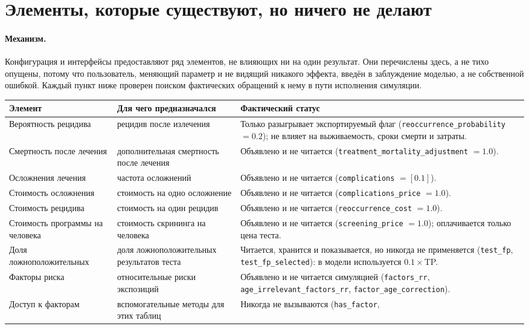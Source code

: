 \documentclass[12pt,a4paper]{article}
\newcommand{\id}[1]{\texttt{#1}}
\newcommand{\mech}[1]{\paragraph{Механизм.} #1}
\begin{document}
\section{Элементы, которые существуют, но ничего не делают}
\label{sec:inactive}

\mech{Конфигурация и интерфейсы предоставляют ряд элементов, не влияющих ни на один результат. Они
перечислены здесь, а не тихо опущены, потому что пользователь, меняющий параметр и не видящий никакого
эффекта, введён в заблуждение моделью, а не собственной ошибкой. Каждый пункт ниже проверен поиском
фактических обращений к нему в пути исполнения симуляции.

\begin{center}
\footnotesize\setlength{\tabcolsep}{3pt}
\begin{tabular}{@{}p{4.3cm}p{3.8cm}p{7.2cm}@{}}
\toprule
\textbf{Элемент} & \textbf{Для чего предназначался} & \textbf{Фактический статус} \\
\midrule
Вероятность рецидива & рецидив после излечения & Только разыгрывает экспортируемый флаг
(\id{reoccurrence\_probability} $=0.2$); не влияет на выживаемость, сроки смерти и затраты. \\
Смертность после лечения & дополнительная смертность после лечения & Объявлено и не читается
(\id{treatment\_mortality\_adjustment} $=1.0$). \\
Осложнения лечения & частота осложнений & Объявлено и не читается
(\id{complications} $=[0.1]$). \\
Стоимость осложнения & стоимость на одно осложнение & Объявлено и не читается
(\id{complications\_price} $=1.0$). \\
Стоимость рецидива & стоимость на один рецидив & Объявлено и не читается
(\id{reoccurrence\_cost} $=1.0$). \\
Стоимость программы на человека & стоимость скрининга на человека & Объявлено и не читается
(\id{screening\_price} $=1.0$); оплачивается только цена теста. \\
Доля ложноположительных & доля ложноположительных результатов теста & Читается, хранится и показывается, но
никогда не применяется (\id{test\_fp}, \id{test\_fp\_selected}): в модели используется
$0.1\times$TP. \\
Факторы риска & относительные риски экспозиций & Объявлено и не читается симуляцией
(\id{factors\_rr}, \id{age\_irrelevant\_factors\_rr}, \id{factor\_age\_correction}). \\
Доступ к факторам & вспомогательные методы для этих таблиц & Никогда не вызываются (\id{has\_factor},

\end{tabular}
\end{center}}
\end{document}
